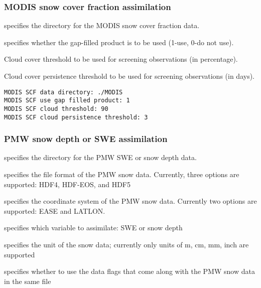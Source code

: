  
 \subsubsection{MODIS snow cover fraction assimilation}
 \label{sssec:modisscfda}
 

 
  specifies the directory for
 the MODIS snow cover fraction data.

  specifies whether 
 the gap-filled product is to be used (1-use, 0-do not use).

  Cloud cover threshold to be 
 used for screening observations (in percentage).

  Cloud cover persistence
 threshold to be used for screening observations (in days).
 

 \begin{Verbatim}[frame=single]
MODIS SCF data directory: ./MODIS
MODIS SCF use gap filled product: 1
MODIS SCF cloud threshold: 90
MODIS SCF cloud persistence threshold: 3
 \end{Verbatim}

 
 \subsubsection{PMW snow depth or SWE assimilation}
 \label{sssec:pmwsnowdepthda}
 

 
  specifies the directory for the
 PMW SWE or snow depth data.

  specifies 
 the file format of the PMW snow data. Currently, three options
 are supported: HDF4, HDF-EOS, and HDF5

  specifies 
 the coordinate system of the PMW snow data. Currently two options
 are supported: EASE and LATLON.

  specifies which variable
 to assimilate: SWE or snow depth

  specifies the unit of
 the snow data; currently only units of m, cm, mm, inch are supported

  specifies whether to use
 the data flags that come along with the PMW snow data in the same file

